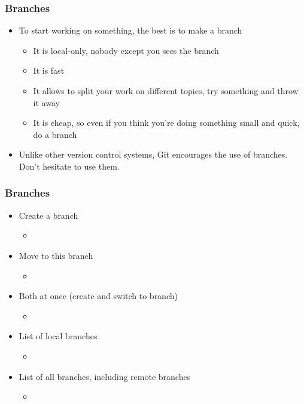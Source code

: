 \begin{frame}
  \frametitle{Branches}
  \begin{itemize}
  \item To start working on something, the best is to make a branch
    \begin{itemize}
    \item It is local-only, nobody except you sees the branch
    \item It is fast
    \item It allows to split your work on different topics, try
      something and throw it away
    \item It is cheap, so even if you think you're doing something
      small and quick, do a branch
    \end{itemize}
  \item Unlike other version control systems, Git encourages the use
    of branches. Don't hesitate to use them.
  \end{itemize}
\end{frame}

\begin{frame}
  \frametitle{Branches}
  \begin{itemize}
  \item Create a branch
    \begin{itemize}
    \item {}
    \end{itemize}
  \item Move to this branch
    \begin{itemize}
    \item {}
    \end{itemize}
  \item Both at once (create and switch to branch)
    \begin{itemize}
    \item {}
    \end{itemize}
  \item List of local branches
    \begin{itemize}
    \item {}
    \end{itemize}
  \item List of all branches, including remote branches
    \begin{itemize}
    \item {}
    \end{itemize}
  \end{itemize}
\end{frame}

